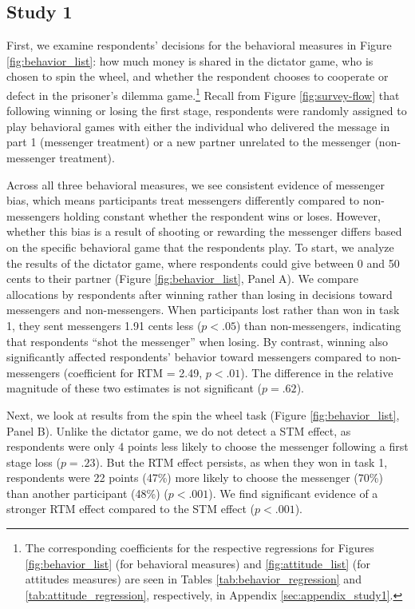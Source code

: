\subsection{Study 1}

First, we examine respondents' decisions for the behavioral measures in Figure \ref{fig:behavior_list}: how
much money is shared in the dictator game, who is chosen to spin the
wheel, and whether the respondent chooses to cooperate or defect in the
prisoner's dilemma game.\footnote{The corresponding coefficients for
 the respective regressions for Figures \ref{fig:behavior_list} (for behavioral measures) and \ref{fig:attitude_list} (for attitudes measures) are seen in Tables \ref{tab:behavior_regression} and \ref{tab:attitude_regression}, respectively, in
 Appendix \ref{sec:appendix_study1}.} Recall from Figure \ref{fig:survey-flow} that following winning or
losing the first stage, respondents were randomly assigned to play
behavioral games with either the individual who delivered the message in
part 1 (messenger treatment) or a new partner unrelated to the messenger
(non-messenger treatment).



Across all three behavioral measures, we see consistent evidence of
messenger bias, which means participants treat messengers differently
compared to non-messengers holding constant whether the respondent wins or
loses. However, whether this bias is a result of shooting or rewarding
the messenger differs based on the specific behavioral game that the
respondents play. To start, we analyze the results of the dictator game,
where respondents could give between 0 and 50 cents to their partner
(Figure \ref{fig:behavior_list}, Panel A). We compare allocations by respondents after
winning rather than losing in decisions toward messengers and
non-messengers. When participants lost rather than won in task 1, they
sent messengers 1.91 cents less ($p < .05$) than
non-messengers, indicating that respondents ``shot the messenger''
when losing. By contrast, winning also significantly affected respondents'
behavior toward messengers compared to non-messengers (coefficient for
RTM = 2.49, $p < .01$). The difference in the relative
magnitude of these two estimates is not significant ($p =
.62$).

Next, we look at results from the spin the wheel task (Figure \ref{fig:behavior_list}, Panel B). Unlike the dictator game, we do not detect a STM effect, as 
respondents were only 4 points less likely to choose the messenger following
a first stage loss ($p = .23$). But the RTM effect persists, as when
they won in task 1, respondents were 22 points (47\%) more likely to
choose the messenger (70\%) than another participant
(48\%) ($p < .001$). We find significant
evidence of a stronger RTM effect compared to the STM effect ($p < .001$).

